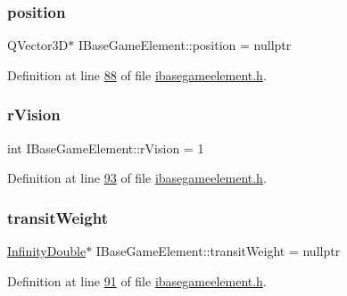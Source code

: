 \subsubsection{\texorpdfstring{position}{position}}
{\footnotesize\ttfamily Q\+Vector3D$\ast$ I\+Base\+Game\+Element\+::position = nullptr\hspace{0.3cm}{\ttfamily [protected]}}



Definition at line \hyperlink{a00047_source_l00088}{88} of file \hyperlink{a00047_source}{ibasegameelement.\+h}.

\mbox{\label{a00137_ae0ad3c240950eba352aeb04e6a9296b4}} 
\subsubsection{\texorpdfstring{r\+Vision}{rVision}}
{\footnotesize\ttfamily int I\+Base\+Game\+Element\+::r\+Vision = 1\hspace{0.3cm}{\ttfamily [protected]}}



Definition at line \hyperlink{a00047_source_l00093}{93} of file \hyperlink{a00047_source}{ibasegameelement.\+h}.

\mbox{\label{a00137_a865c937433f7d46665ca17e5adccd9df}} 
\subsubsection{\texorpdfstring{transit\+Weight}{transitWeight}}
{\footnotesize\ttfamily \hyperlink{a00161}{Infinity\+Double}$\ast$ I\+Base\+Game\+Element\+::transit\+Weight = nullptr\hspace{0.3cm}{\ttfamily [protected]}}



Definition at line \hyperlink{a00047_source_l00091}{91} of file \hyperlink{a00047_source}{ibasegameelement.\+h}.

\mbox{\label{a00137_a73a4ca23072b617f3d17004e3c671bca}} 
